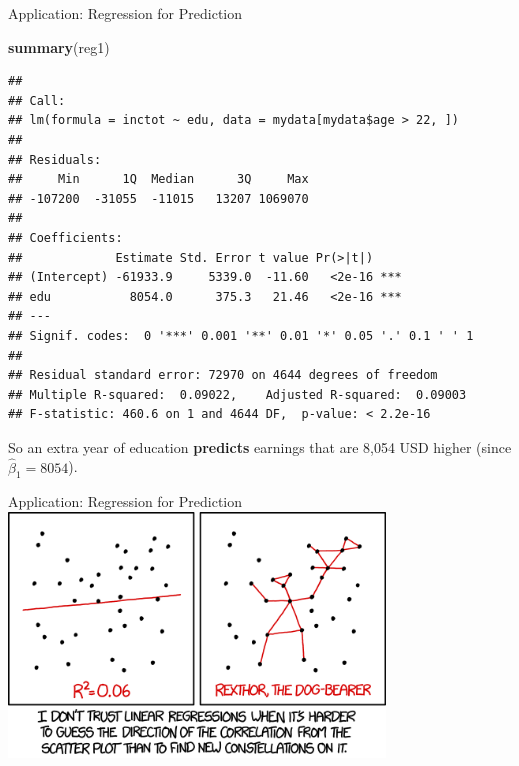 \documentclass[
  ignorenonframetext,
]{beamer}
\newenvironment{Shaded}{\begin{snugshade}}{\end{snugshade}}
\newcommand{\KeywordTok}[1]{\textcolor[rgb]{0.13,0.29,0.53}{\textbf{#1}}}
\newcommand{\NormalTok}[1]{#1}
\begin{document}
\begin{frame}[fragile]{Application: Regression for Prediction}
\protect\hypertarget{application-regression-for-prediction-2}{}
\tiny

\begin{Shaded}
\begin{Highlighting}[]
\KeywordTok{summary}\NormalTok{(reg1)}
\end{Highlighting}
\end{Shaded}

\begin{verbatim}
## 
## Call:
## lm(formula = inctot ~ edu, data = mydata[mydata$age > 22, ])
## 
## Residuals:
##     Min      1Q  Median      3Q     Max 
## -107200  -31055  -11015   13207 1069070 
## 
## Coefficients:
##             Estimate Std. Error t value Pr(>|t|)    
## (Intercept) -61933.9     5339.0  -11.60   <2e-16 ***
## edu           8054.0      375.3   21.46   <2e-16 ***
## ---
## Signif. codes:  0 '***' 0.001 '**' 0.01 '*' 0.05 '.' 0.1 ' ' 1
## 
## Residual standard error: 72970 on 4644 degrees of freedom
## Multiple R-squared:  0.09022,    Adjusted R-squared:  0.09003 
## F-statistic: 460.6 on 1 and 4644 DF,  p-value: < 2.2e-16
\end{verbatim}

\normalsize

So an extra year of education \textbf{predicts} earnings that are 8,054
USD higher (since \(\hat{\beta}_1=8054\)).
\end{frame}

\begin{frame}{Application: Regression for Prediction}
\protect\hypertarget{application-regression-for-prediction-3}{}
\center \includegraphics[width=0.75\textwidth,height=\textheight]{"images/scatterintuitioncomic.png"}
\end{frame}
\end{document}
